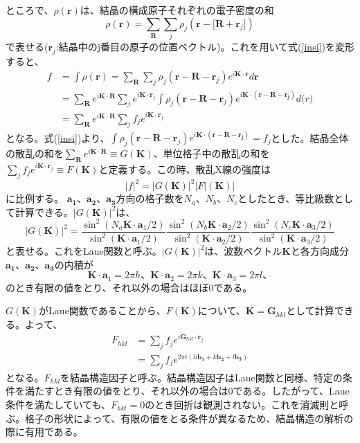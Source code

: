 \documentclass[11pt,a4j,uplatex]{jsarticle}
\begin{document}
\newpage
ところで、$\rho(\bm{r})$は、結晶の構成原子それぞれの電子密度の和
\begin{equation}
  \rho(\bm{r})=\sum_{\bm{R}}\sum_j\rho_j(\bm{r-[R+}\bm{r}_j])
\end{equation}
で表せる($\bm{r}_j$:結晶中のj番目の原子の位置ベクトル)。これを用いて式(\ref{insi})を変形すると、
\begin{equation}
  \begin{split}
  f&=\int\rho(\bm{r})=\sum_{\bm{R}}\sum_j\rho_j(\bm{r-R-}\bm{r}_j)e^{i\bm{K\cdot r}}d\bm{r}\\
  &=\sum_{\bm{R}}e^{i\bm{K\cdot R}}\sum_je^{i\bm{K}\cdot\bm{r}_j}\int\rho_j(\bm{r-R-}\bm{r}_j)e^{i\bm{K\cdot (\bm{r-R-}\bm{r}_j)}}d\bm(r)\\
  &=\sum_{\bm{R}}e^{i\bm{K\cdot R}}\sum_jf_je^{i\bm{K}\cdot\bm{r}_j}
\end{split}
\end{equation}
となる。式(\ref{insi})より、$\int\rho_j(\bm{r-R-}\bm{r}_j)e^{i\bm{K\cdot (\bm{r-R-}\bm{r}_j)}}=f_j$とした。結晶全体の散乱の和を$\sum_{\bm{R}}e^{i\bm{K\cdot R}}\equiv G(\bm{K})$、単位格子中の散乱の和を$\sum_jf_je^{i\bm{K}\cdot\bm{r}_j}\equiv F(\bm{K})$と定義する。この時、散乱X線の強度は
\begin{equation}
  {|f|}^2={|G\bm{(K)}|^2}{|F|\bm{(K)}|}
  \label{kyoudo}
\end{equation}に比例する。
$\bm{a_1}、\bm{a_2}、\bm{a_3}$方向の格子数を$N_a、N_b、N_c$としたとき、等比級数として計算できる。$|G(\bm{K})|^2$は、
\begin{equation}
  |G(\bm{K})|^2=\frac{\sin^2(N_a\bm{K}\cdot\bm{a}_1/2)}{\sin^2(\bm{K}\cdot\bm{a}_1/2)}\frac{\sin^2(N_b\bm{K}\cdot\bm{a}_2/2)}{\sin^2(\bm{K}\cdot\bm{a}_2/2)}\frac{\sin^2(N_c\bm{K}\cdot\bm{a}_3/2)}{\sin^2(\bm{K}\cdot\bm{a}_3/2)}
\end{equation}
と表せる。これをLaue関数と呼ぶ。$|G(\bm{K})|^2$は、波数ベクトル$\bm{K}$と各方向成分$\bm{a_1}、\bm{a_2}、\bm{a_3}$の内積が
\begin{equation}
  \bm{K}\cdot\bm{a}_1=2\pi h、\bm{K}\cdot\bm{a}_2=2\pi k、\bm{K}\cdot\bm{a}_3=2\pi l、
\end{equation}
のとき有限の値をとり、それ以外の場合はほぼ0である。%

$G(\bm{K})$がLaue関数であることから、$F(\bm{K})$について、$\bm{K}=\bm{G}_{hkl}$として計算できる。よって、
\begin{equation}
\begin{split}
    F_{hkl}&=\sum_jf_je^{i\bm{G}_{hkl}\cdot\bm{r}_j}\\
    &=\sum_jf_je^{2\pi i(h\bm{b_1}+k\bm{b_2}+l\bm{b_3})}
\end{split}
\end{equation}
となる。$F_{hkl}$を結晶構造因子と呼ぶ。結晶構造因子はLaue関数と同様、特定の条件を満たすとき有限の値をとり、それ以外の場合は0である。したがって、Laue条件を満たしていても、$F_{hkl}=0$のとき回折は観測されない。これを消滅則と呼ぶ。格子の形状によって、有限の値をとる条件が異なるため、結晶構造の解析の際に有用である。
\end{document}
